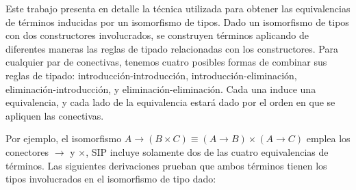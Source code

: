 Este trabajo presenta en detalle la técnica utilizada para obtener las equivalencias de términos inducidas por un isomorfismo de tipos.
Dado un isomorfismo de tipos con dos constructores involucrados, se construyen términos aplicando de diferentes maneras las reglas de tipado relacionadas con los constructores.
Para cualquier par de conectivas, tenemos cuatro posibles formas de combinar sus reglas de tipado: introducción-introducción, introducción-eliminación, eliminación-introducción, y eliminación-eliminación.
Cada una induce una equivalencia, y cada lado de la equivalencia estará dado por el orden en que se apliquen las conectivas.

Por ejemplo, el isomorfismo $A \rightarrow (B \times C) \equiv (A \rightarrow B) \times (A \rightarrow C)$ emplea los conectores $\rightarrow$ y $\times$, SIP incluye solamente dos de las cuatro equivalencias de términos.
Las siguientes derivaciones prueban que ambos términos tienen los tipos involucrados en el isomorfismo de tipo dado:

